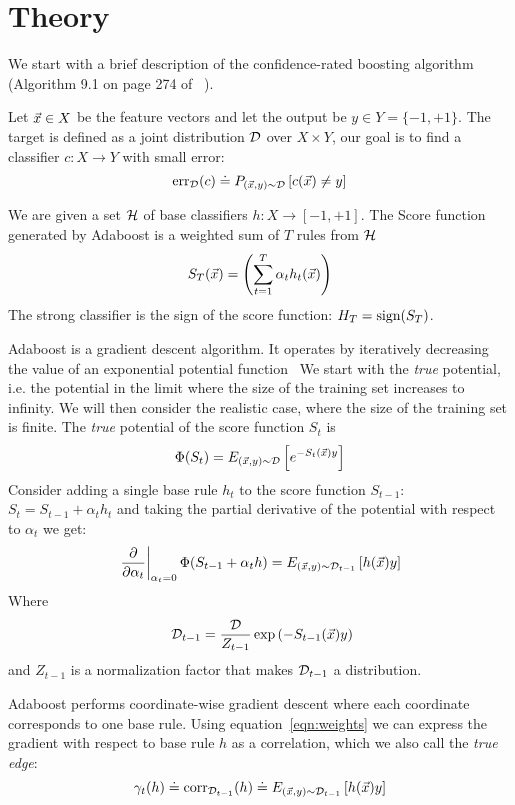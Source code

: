 \section{Theory}
We start with a brief description of the confidence-rated boosting
algorithm (Algorithm 9.1 on page 274 of ~\cite{book}).

Let $\vec{x} \in X$ be the feature vectors and let the output be $y \in
Y= \{-1,+1\}$. The target is defined as a joint distribution ${\cal D}$ over
$X \times Y$, our goal is to find a classifier $c: X \to Y$ with small
error:
$$\mbox{err}_{{\cal D}}(c) \doteq P_{(\vec{x},y)\sim {\cal D}}\left[c(\vec{x}) \neq y \right]$$

We are given a set $\mathcal{H}$ of base classifiers $h:X \to [-1,+1]$. The
Score function generated by Adaboost is a weighted sum of $T$ rules from
$\mathcal{H}$
\[
S_T(\vec{x}) = \left( \sum_{t=1}^T \alpha_t h_t(\vec{x}) \right)
\]
The strong classifier is the sign of the score function: $H_T =
\mbox{sign}(S_T)$.  

Adaboost is a gradient descent algorithm. It operates by iteratively
decreasing the value of an exponential potential function~\cite{Other
  potential functions have been studied, in this work we restrict
  ourselves to the original exponential potential function.}  We start
with the {\em true} potential, i.e. the potential in the limit where
the size of the training set increases to infinity. We will then
consider the realistic case, where the size of the training set is
finite.  The {\em true} potential of the score function $S_t$ is
\[
\Phi(S_t) = E_{(\vec{x},y) \sim {\cal D}}\left[e^{-S_t(\vec{x})y} \right]
\]
Consider adding a single base rule $h_t$ to the score function
$S_{t-1}$:
$S_t=S_{t-1}+\alpha_t h_t$ and taking the partial derivative of the potential with respect
to $\alpha_t$ we get:
\begin{equation} \label{eqn:weights}
\left. \frac{\partial}{\partial \alpha_t}\right|_{\alpha_t=0} \Phi(S_{t-1}+\alpha_t h)
= E_{(\vec{x},y) \sim {\cal D}_{t-1}}\left[h(\vec{x}) y \right]
\end{equation}
Where
\begin{equation} ~\label{eqn:Dt}
{\cal D}_{t-1} = \frac{{\cal D}}{Z_{t-1}} \exp\left( -S_{t-1}(\vec{x})y \right)
\end{equation}
and $Z_{t-1}$ is a normalization factor that makes ${\cal D}_{t-1}$ a
distribution.

Adaboost performs coordinate-wise gradient descent where each
coordinate corresponds to one base rule. Using
equation~\ref{eqn:weights} we can express the gradient with respect to
base rule $h$ as a correlation, which we also call the {\em true edge}: 
\begin{equation} \label{eqn:true-edge}
\gamma_{t}(h) \doteq \mbox{corr}_{{\cal D}_{t-1}}(h) \doteq E_{(\vec{x},y) \sim {\cal D}_{t-1}}\left[h(\vec{x}) y \right]
\end{equation}


